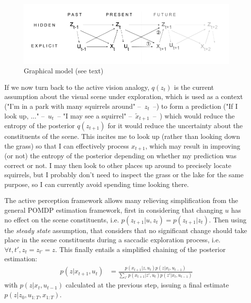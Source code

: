 \documentclass{article} %
\begin{document}
\begin{figure}[t!]
	\centerline{
		\includegraphics[width = \linewidth]{img/ICLR-graphical.png} 
	}
	\caption{Graphical model (see text)}\label{fig:graphical}
\end{figure}

If we now turn back to the active vision analogy, $q(z_t)$ is the current assumption about the visual scene under exploration, which is used as a context ("I'm in a park with many squirrels around" --~$z_t$~--) to form a prediction ("If I look up, ..." --~$u_t$~-- "I may see a squirrel" --~$\tilde{x}_{t+1}$~--~) which would reduce the entropy of the posterior $q(z_{t+1})$ for it would reduce the uncertainty about the constituents of the scene.  This incites me to look up (rather than looking down the grass) so that I can effectively process $x_{t+1}$, which may result in improving (or not) the entropy of the posterior depending on whether my prediction was correct or not. I may then look to other places up around to precisely locate squirrels, but I probably don't need to inspect the grass or the lake for the same purpose, so I can currently avoid spending time looking there.   

The active perception framework allows many relieving simplification from the general POMDP estimation framework, first in considering that changing $u$ has no effect on the scene constituents, i.e. $p(z_{t+1}|u,z_t) = p(z_{t+1}|z_t)$. Then using the \emph{steady state} assumption, that considers that no significant change should take place in the scene constituents during a saccadic exploration process, i.e. $\forall t, t', z_{t} = z_{t'} = z$. This finally entails a simplified chaining of the posterior estimation:
 	\begin{align*}
 	p(z|x_{t+1},u_t) &= \frac{p(x_{t+1}|z,u_t) p(z|x_t, u_{t-1})}{\sum_{z'}p(x_{t+1}|z',u_t) p(z'|x_t, u_{t-1})}
 	\end{align*}
with $p(z|x_t, u_{t-1})$ calculated at the previous step, issuing a final estimate $p(z|z_0, u_{1:T}, x_{1:T})$.  


\end{document}
